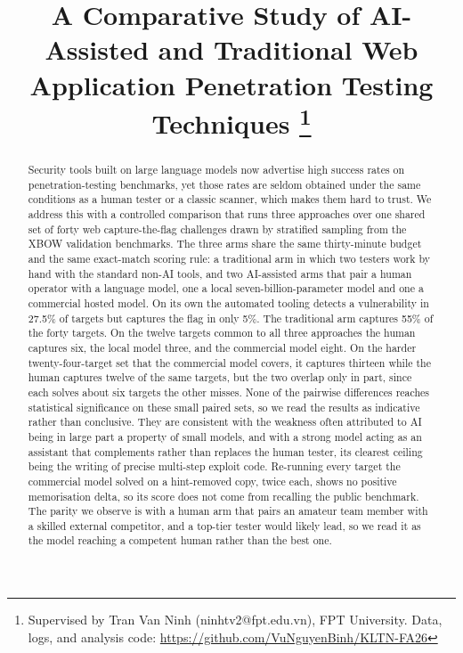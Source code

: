 \documentclass[conference]{IEEEtran}
\begin{document}
\title{A Comparative Study of AI-Assisted and Traditional Web Application Penetration Testing Techniques%
\thanks{Supervised by Tran Van Ninh (ninhtv2@fpt.edu.vn), FPT University. Data, logs, and analysis code: \url{https://github.com/VuNguyenBinh/KLTN-FA26}}}

\author{%
}

\maketitle

\begin{abstract}
Security tools built on large language models now advertise high success rates on penetration-testing benchmarks, yet those rates are seldom obtained under the same conditions as a human tester or a classic scanner, which makes them hard to trust. We address this with a controlled comparison that runs three approaches over one shared set of forty web capture-the-flag challenges drawn by stratified sampling from the XBOW validation benchmarks. The three arms share the same thirty-minute budget and the same exact-match scoring rule: a traditional arm in which two testers work by hand with the standard non-AI tools, and two AI-assisted arms that pair a human operator with a language model, one a local seven-billion-parameter model and one a commercial hosted model. On its own the automated tooling detects a vulnerability in 27.5\% of targets but captures the flag in only 5\%. The traditional arm captures 55\% of the forty targets. On the twelve targets common to all three approaches the human captures six, the local model three, and the commercial model eight. On the harder twenty-four-target set that the commercial model covers, it captures thirteen while the human captures twelve of the same targets, but the two overlap only in part, since each solves about six targets the other misses. None of the pairwise differences reaches statistical significance on these small paired sets, so we read the results as indicative rather than conclusive. They are consistent with the weakness often attributed to AI being in large part a property of small models, and with a strong model acting as an assistant that complements rather than replaces the human tester, its clearest ceiling being the writing of precise multi-step exploit code. Re-running every target the commercial model solved on a hint-removed copy, twice each, shows no positive memorisation delta, so its score does not come from recalling the public benchmark. The parity we observe is with a human arm that pairs an amateur team member with a skilled external competitor, and a top-tier tester would likely lead, so we read it as the model reaching a competent human rather than the best one.
\end{abstract}
\end{document}
